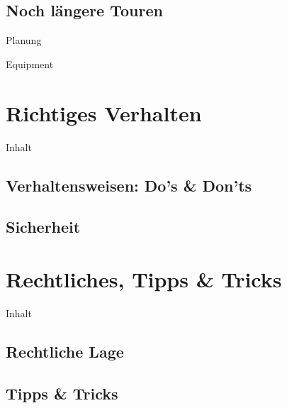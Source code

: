 \documentclass{beamer}
\begin{document}
		\subsection{Noch längere Touren}
		
			\begin{frame}{Planung}
			\end{frame}
			
			\begin{frame}{Equipment}
			\end{frame}
	
	\section{Richtiges Verhalten}
		
		\begin{frame}[t]{Inhalt}
		\end{frame}
		
		\subsection{Verhaltensweisen: Do's \& Don'ts}
			
			\begin{frame}{}
			\end{frame}
			
		\subsection{Sicherheit}
			
			\begin{frame}{}
			\end{frame}
	
	\section{Rechtliches, Tipps \& Tricks}
		
		\begin{frame}[t]{Inhalt}
		\end{frame}
	
		\subsection{Rechtliche Lage}
			
			\begin{frame}{}
			\end{frame}
		
		\subsection{Tipps \& Tricks}
\end{document}

